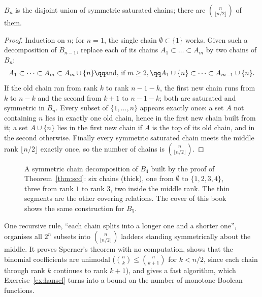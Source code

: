 \begin{theorem}\label{thm:scd}
$B_n$ is the disjoint union of symmetric saturated chains; there are $\binom n{\lfloor n/2\rfloor}$ of them.
\end{theorem}
\begin{proof}
Induction on $n$; for $n=1$, the single chain $\emptyset\subset\{1\}$ works. Given such a decomposition of $B_{n-1}$, replace each of its chains
$A_1\subset\dots\subset A_m$ by two chains of $B_n$:
\[
\begin{gathered}A_1\subset\dots\subset A_m\subset A_m\cup\{n\}\qq\text{and, if }m\ge2,\qq A_1\cup\{n\}\subset\dots\subset A_{m-1}\cup\{n\}.\end{gathered}
\]
If the old chain ran from rank $k$ to rank $n-1-k$, the first new chain runs from $k$ to $n-k$ and the second from $k+1$ to $n-1-k$; both are
saturated and symmetric in $B_n$. Every subset of $\{1,\dots,n\}$ appears exactly once: a set $A$ not containing $n$ lies in exactly one old chain,
hence in the first new chain built from it; a set $A\cup\{n\}$ lies in the first new chain if $A$ is the top of its old chain, and in the
second otherwise. Finally every symmetric saturated chain meets the middle rank $\lfloor n/2\rfloor$ exactly once, so the number of chains is
$\binom n{\lfloor n/2\rfloor}$.
\end{proof}

\begin{figure}[ht]
\centering
{}
\caption{A symmetric chain decomposition of $B_4$ built by the proof of Theorem~\ref{thm:scd}: six chains (thick), one from $\emptyset$ to
$\{1,2,3,4\}$, three from rank $1$ to rank $3$, two inside the middle rank. The thin segments are the other covering
relations. The cover of this book shows the same construction for $B_5$.}
\label{fig:scd}
\end{figure}

\begin{beauty}
One recursive rule, ``each chain splits into a longer one and a shorter one'', organises all $2^n$ subsets into
$\binom n{\lfloor n/2\rfloor}$ ladders standing symmetrically about the middle. It proves Sperner's theorem with no computation, shows that the
binomial coefficients are unimodal ($\binom nk\le\binom n{k+1}$ for $k<n/2$, since each chain through rank $k$ continues to rank $k+1$), and gives a
fast algorithm, which Exercise~\ref{ex:hansel} turns into a bound on the number of monotone Boolean functions.
\end{beauty}

